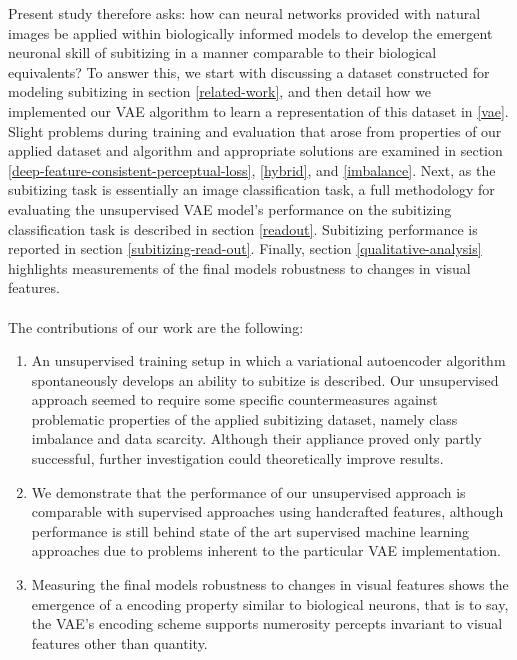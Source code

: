 \documentclass[twocolumn]{article}
\begin{document}
Present study therefore asks: how can neural networks provided with natural images be applied within biologically informed models to develop the emergent neuronal skill of subitizing in a manner comparable to their biological equivalents? To answer this, we start %
with discussing a dataset constructed for modeling subitizing in section \ref{related-work}, and then detail how we implemented our VAE algorithm to learn a representation of this dataset in \ref{vae}.  Slight problems during training and evaluation that arose from properties of our applied dataset and algorithm and appropriate solutions are examined in section \ref{deep-feature-consistent-perceptual-loss}, \ref{hybrid}, and \ref{imbalance}.  Next, as the subitizing task is essentially an image classification task, a full
methodology for evaluating the unsupervised VAE model's performance on
the subitizing classification task is described in section \ref{readout}. Subitizing performance is reported in section \ref{subitizing-read-out}. Finally, section \ref{qualitative-analysis} highlights measurements of the final models robustness to changes in visual features.\\ \\
\noindent The contributions of our work are the following:
\begin{enumerate}[noitemsep,]
\item An unsupervised training setup in which a variational autoencoder algorithm spontaneously develops an ability to subitize is described. Our unsupervised approach seemed to require some specific countermeasures against problematic properties of the applied subitizing dataset, namely class imbalance and data scarcity. Although their appliance proved only partly successful, further investigation could theoretically improve results. 
\item We demonstrate that the
performance of our unsupervised approach is comparable with supervised
approaches using handcrafted features, although performance is still
behind state of the art supervised machine learning approaches due to
problems inherent to the particular VAE implementation. 
\item Measuring the final models robustness to changes in visual features
shows the emergence of a encoding property similar to biological neurons, that is
to say, the VAE's encoding scheme supports numerosity
percepts invariant to visual features other than quantity.
\end{enumerate}
\end{document}
